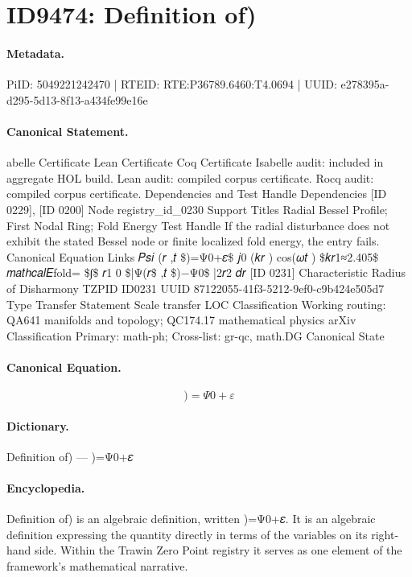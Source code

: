 \section*{ID9474: Definition of)}
\paragraph{Metadata.}
PiID: 5049221242470 | RTEID: RTE:P36789.6460:T4.0694 | UUID: e278395a-d295-5d13-8f13-a434fe99e16e

\paragraph{Canonical Statement.}
abelle Certificate Lean Certificate Coq Certificate Isabelle audit: included in aggregate HOL build. Lean audit: compiled corpus certificate. Rocq audit: compiled corpus certificate. Dependencies and Test Handle Dependencies [ID 0229], [ID 0200] Node registry\_id\_0230 Support Titles Radial Bessel Profile; First Nodal Ring; Fold Energy Test Handle If the radial disturbance does not exhibit the stated Bessel node or finite localized fold energy, the entry fails. Canonical Equation Links 𝑃𝑠𝑖 (𝑟 ,𝑡 \$)=Ψ0+𝜀\$ 𝑗0 (𝑘𝑟 ) cos(𝜔𝑡 ) \$𝑘𝑟1≈2.405\$ 𝑚𝑎𝑡ℎ𝑐𝑎𝑙𝐸fold= \$∫\$ 𝑟1 0 \$|Ψ(𝑟\$ ,𝑡 \$)−Ψ0\$ |2𝑟2 𝑑𝑟 [ID 0231] Characteristic Radius of Disharmony TZPID ID0231 UUID 87122055-41f3-5212-9ef0-c9b424e505d7 Type Transfer Statement Scale transfer LOC Classification Working routing: QA641 manifolds and topology; QC174.17 mathematical physics arXiv Classification Primary: math-ph; Cross-list: gr-qc, math.DG Canonical State

\paragraph{Canonical Equation.}
\[
)=Ψ0+𝜀
\]

\paragraph{Dictionary.}
Definition of) — )=Ψ0+𝜀

\paragraph{Encyclopedia.}
Definition of) is an algebraic definition, written )=Ψ0+𝜀. It is an algebraic definition expressing the quantity directly in terms of the variables on its right-hand side. Within the Trawin Zero Point registry it serves as one element of the framework's mathematical narrative.
